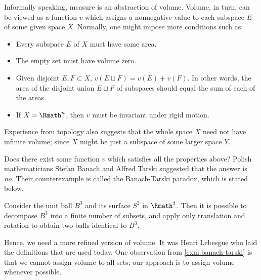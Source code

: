 \label{sec:measure}

Informally speaking, measure is an abstraction of volume.
Volume, in turn, can be viewed as a function \(v\) which assigns
a nonnegative value to each subspace \(E\) of some given space \(X\).
Normally, one might impose more conditions such as:
\begin{itemize}
    \item Every subspace \(E\) of \(X\) must have some area.
    \item The empty set must have volume zero.
    \item Given disjoint \(E,F\subset X\), \(v(E\sqcup F)=v(E)+v(F)\).
    In other words,
    the area of the disjoint union \(E\sqcup F\) of subspaces
    should equal the sum of each of the areas.
    \item If \(X=\Rmath^n\),
    then \(v\) must be invariant under rigid motion.
\end{itemize}
Experience from topology also suggests that
the whole space \(X\) need not have infinite volume;
since \(X\) might be just a subspace of some larger space \(Y\).

Does there exist some function \(v\)
which satisfies all the properties above?
Polish mathematicians Stefan Banach and Alfred Tarski suggested that
the answer is \emph{no}.
Their counterexample is called the Banach-Tarski paradox,
which is stated below.

\begin{example}
    \label{exm:banach-tarski}
    Consider the unit ball \(B^3\) and its surface \(S^2\)
    in \(\Rmath^3\).
    Then it is possible to decompose \(B^3\)
    into a finite number of subsets,
    and apply only translation and rotation
    to obtain two balls identical to \(B^3\).
\end{example}

Hence, we need a more refined version of volume.
It was Henri Lebesgue who laid the definitions that are used today.
One observation from \cref{exm:banach-tarski} is that
we cannot assign volume to all sets;
our approach is to assign volume whenever possible.

